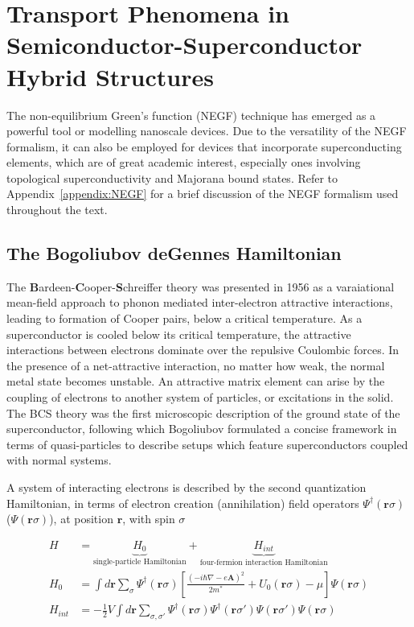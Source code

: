 \chapter{Transport Phenomena in Semiconductor-Superconductor Hybrid Structures}

The non-equilibrium Green's function (NEGF) technique has emerged as a powerful tool or modelling nanoscale devices. Due to the versatility of the NEGF formalism, it can also be employed for devices that incorporate superconducting elements, which are of great academic interest, especially ones involving topological superconductivity and Majorana bound states. Refer to Appendix~\ref{appendix:NEGF} for a brief discussion of the NEGF formalism used throughout the text. \par 

\section{The Bogoliubov deGennes Hamiltonian}

The {\bf B}ardeen-{\bf C}ooper-{\bf S}chreiffer theory was presented in 1956 as a varaiational mean-field approach to phonon mediated inter-electron attractive interactions, leading to formation of Cooper pairs, below a critical temperature. As a superconductor is cooled below its critical temperature, the attractive interactions between electrons dominate over the repulsive Coulombic forces. In the presence of a net-attractive interaction, no matter how weak, the normal metal state becomes unstable. An attractive matrix element can arise by the coupling of electrons to another system of particles, or excitations in the solid. The BCS theory was the first microscopic description of the ground state of the superconductor, following which Bogoliubov formulated a concise framework in terms of quasi-particles to describe setups which feature superconductors coupled with normal systems. \par 

A system of interacting electrons is described by the second quantization Hamiltonian, in terms of electron creation (annihilation) field operators $\Psi^{\dagger}(\textbf{r}\sigma)$ ($\Psi(\textbf{r}\sigma)$), at position $\textbf{r}$, with spin $\sigma$

\begin{equation}
 	\begin{aligned}
 	H &= \underbrace{H_{0}}_{\text{single-particle Hamiltonian}} +\underbrace{H_{int}}_{\text{four-fermion interaction Hamiltonian}} \\
        H_{0} &= \int d\textbf{r} \sum_{\sigma} \Psi^{\dagger}(\textbf{r}\sigma) \left[ \frac{(-i\hbar \nabla - e \textbf{A})^{2}}{2m^{*}} + U_{0}(\textbf{r}\sigma) - \mu \right] \Psi(\textbf{r}\sigma) \\
        H_{int} &= -\frac{1}{2}V \int d\textbf{r} \sum_{\sigma, \sigma'} \Psi^{\dagger}(\textbf{r}\sigma) \Psi^{\dagger}(\textbf{r}\sigma') \Psi(\textbf{r}\sigma') \Psi(\textbf{r}\sigma)
 	\end{aligned}
\end{equation}
 
